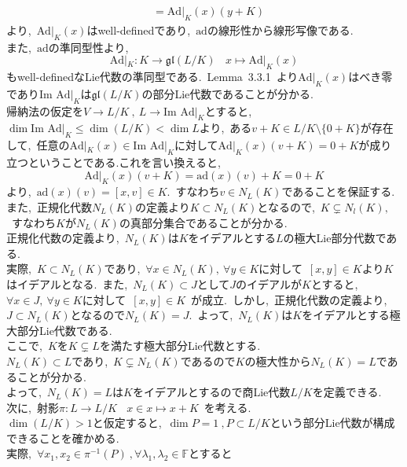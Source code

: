 \documentclass[uplatex,dvipdfmx]{jsarticle}
\begin{document}
\begin{myproof}
\begin{equation*}
\begin{split}
        &=\text{Ad}|_K(x)(y+K)
    \end{split}
\end{equation*}
より,~$\text{Ad}|_K(x)$はwell-definedであり,~$\text{ad}$の線形性から線形写像である.\\
また,~$\text{ad}$の準同型性より,~
\begin{equation*}
    \text{Ad}|_K:K\to \mathfrak{gl}(L/K)~~~~x\mapsto \text{Ad}|_K(x)
\end{equation*}
もwell-definedなLie代数の準同型である.~Lemma~3.3.1~より$\text{Ad}|_K(x)$はべき零であり$\text{Im Ad}|_K $は$\mathfrak{gl}(L/K)$の部分Lie代数であることが分かる.\\
帰納法の仮定を$V\to L/K~,~L\to \text{Im Ad}|_K$とすると,~$\dim \text{Im Ad}|_K \leq \dim(L/K)<\dim L$より,~ある$v+K \in L/K \setminus\{0+K\}$が存在して,~任意の$\text{Ad}|_K(x)\in \text{Im Ad}|_K$に対して$\text{Ad}|_K(x)(v+K)=0+K$が成り立つということである.これを言い換えると,
\begin{equation*}
    \text{Ad}|_K(x)(v+K)=\text{ad}(x)(v)+K=0+K
\end{equation*}
より,~$\text{ad}(x)(v)=[x,v]\in K$.~すなわち$v \in N_L(K)$であることを保証する.\\
また,~正規化代数$N_L(K)$の定義より$K\subset N_L(K)$となるので,~$K\subsetneq N_l(K),$~すなわち$K$が$N_L(K)$の真部分集合であることが分かる.\\
正規化代数の定義より,~$N_L(K)$は$K$をイデアルとする$L$の極大Lie部分代数である.\\
実際,~$K\subset N_L(K)$であり,~$\forall x\in N_L(K),~\forall y\in K$に対して~$[x,y]\in K$より$K$はイデアルとなる.~また,~$N_L(K)\subset J$として$J$のイデアルが$K$とすると,~$\forall x\in J,~\forall y\in K$に対して~$[x,y]\in K$~が成立.~しかし,~正規化代数の定義より,~$J\subset N_L(K)$となるので$N_L(K)=J$.~よって,~$N_L(K)$は$K$をイデアルとする極大部分Lie代数である.\\
ここで,~$K$を$K\subsetneq L$を満たす極大部分Lie代数とする.\\
$N_L(K)\subset L$であり,~$K\subsetneq N_L(K)$であるので$K$の極大性から$N_L(K)=L$であることが分かる.\\
よって,~$N_L(K)=L$は$K$をイデアルとするので商Lie代数$L/K$を定義できる.\\
次に,~射影$\pi:L\to L/K~~~~x\in x\mapsto x+K$~を考える.\\
$\dim (L/K)>1$と仮定すると,~$\dim P=1~,P\subset L/K$という部分Lie代数が構成できることを確かめる.\\
実際,~$\forall x_1,x_2 \in \pi^{-1}(P) ~,\forall \lambda_1,\lambda_2 \in \mathbb{F}$とすると

\end{myproof}
\end{document}
